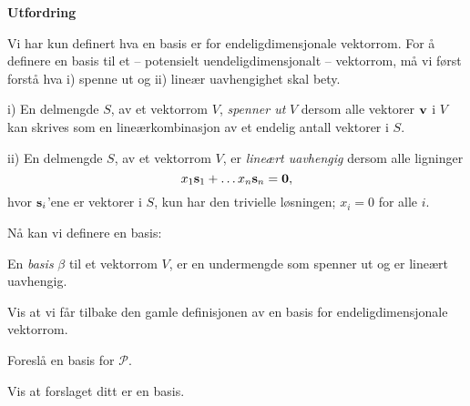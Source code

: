 \begin{oppgave} \textbf{Utfordring}

\noindent
Vi har kun definert hva en basis er for endeligdimensjonale vektorrom. For å definere en basis til et -- potensielt uendeligdimensjonalt -- vektorrom, må vi først forstå hva i) spenne ut og ii) lineær uavhengighet skal bety.

\noindent
i) En delmengde $S$, av et vektorrom $V$, \emph{spenner ut} $V$ dersom alle vektorer $\mathbf{v}$ i $V$ kan skrives som en lineærkombinasjon av et endelig antall vektorer i $S$.

\noindent
ii) En delmengde $S$, av et vektorrom $V$, er \emph{lineært uavhengig} dersom alle ligninger $$x_1\mathbf{s}_1+\dots x_n\mathbf{s}_n=\mathbf{0},$$ hvor $\mathbf{s}_i$'ene er vektorer i $S$, kun har den trivielle løsningen; $x_i=0$ for alle $i$.

\noindent
Nå kan vi definere en basis:

\noindent
En \emph{basis} $\beta$ til et vektorrom $V$, er en undermengde som spenner ut og er lineært uavhengig.

\begin{punkt}
Vis at vi får tilbake den gamle definisjonen av en basis for endeligdimensjonale vektorrom.
\end{punkt}

\begin{punkt}
Foreslå en basis for $\mathcal{P}$.
\end{punkt}

\begin{punkt}
Vis at forslaget ditt er en basis.
\end{punkt}

\end{oppgave}


